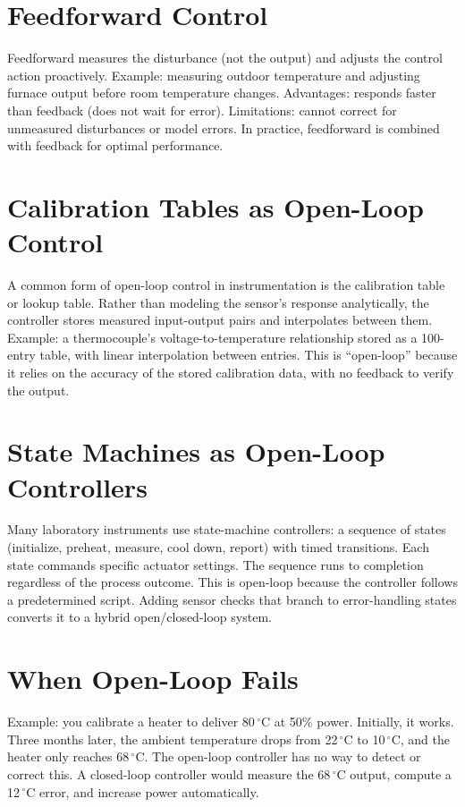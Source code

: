 \documentclass[11pt,letterpaper,twoside,openany]{book}
\newcommand{\degC}{\ensuremath{{}^{\circ}\text{C}}}
\begin{document}
\section{Feedforward Control}
Feedforward measures the disturbance (not the output) and adjusts the control action proactively. Example: measuring outdoor temperature and adjusting furnace output before room temperature changes. Advantages: responds faster than feedback (does not wait for error). Limitations: cannot correct for unmeasured disturbances or model errors. In practice, feedforward is combined with feedback for optimal performance.

\section{Calibration Tables as Open-Loop Control}
A common form of open-loop control in instrumentation is the calibration table or lookup table. Rather than modeling the sensor's response analytically, the controller stores measured input-output pairs and interpolates between them. Example: a thermocouple's voltage-to-temperature relationship stored as a 100-entry table, with linear interpolation between entries. This is ``open-loop'' because it relies on the accuracy of the stored calibration data, with no feedback to verify the output.

\section{State Machines as Open-Loop Controllers}
Many laboratory instruments use state-machine controllers: a sequence of states (initialize, preheat, measure, cool down, report) with timed transitions. Each state commands specific actuator settings. The sequence runs to completion regardless of the process outcome. This is open-loop because the controller follows a predetermined script. Adding sensor checks that branch to error-handling states converts it to a hybrid open/closed-loop system.

\section{When Open-Loop Fails}
Example: you calibrate a heater to deliver 80\,\degC{} at 50\% power. Initially, it works. Three months later, the ambient temperature drops from 22\,\degC{} to 10\,\degC{}, and the heater only reaches 68\,\degC{}. The open-loop controller has no way to detect or correct this. A closed-loop controller would measure the 68\,\degC{} output, compute a 12\,\degC{} error, and increase power automatically.
\end{document}
